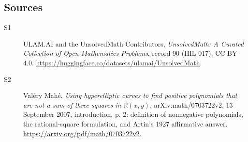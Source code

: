 \documentclass[11pt]{article}
\begin{document}
\subsection{Sources}
\begin{description}
\item[\hypertarget{source:90:1}{S1}] ULAM.AI and the UnsolvedMath Contributors, \emph{UnsolvedMath: A Curated Collection of Open Mathematics Problems}, record 90 (HIL-017). CC BY 4.0. \url{https://huggingface.co/datasets/ulamai/UnsolvedMath}.
\item[\hypertarget{source:90:2}{S2}] Valéry Mahé, \emph{Using hyperelliptic curves to find positive polynomials that are not a sum of three squares in $\mathbb R(x,y)$}, arXiv:math/0703722v2, 13 September 2007, introduction, p. 2: definition of nonnegative polynomials, the rational-square formulation, and Artin's 1927 affirmative answer. \url{https://arxiv.org/pdf/math/0703722v2}.
\end{description}
\label{end:90}
\end{document}
